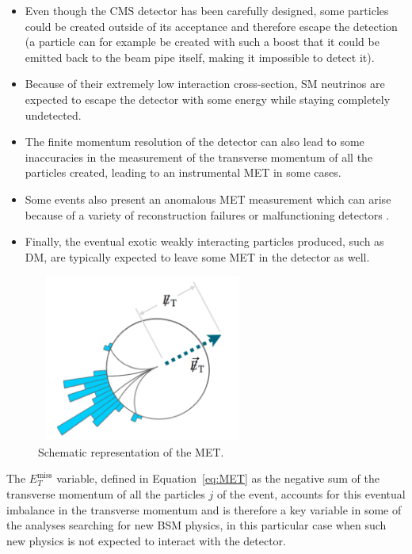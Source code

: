 \documentclass[a4paper, 10pt, openright]{report}
\begin{document}
\begin{itemize}
\item Even though the \ac{CMS} detector has been carefully designed, some particles could be created outside of its acceptance and therefore escape the detection (a particle can for example be created with such a boost that it could be emitted back to the beam pipe itself, making it impossible to detect it).
\item Because of their extremely low interaction cross-section, \ac{SM} neutrinos are expected to escape the detector with some energy while staying completely undetected.
\item The finite momentum resolution of the detector can also lead to some inaccuracies in the measurement of the transverse momentum of all the particles created, leading to an instrumental \ac{MET} in some cases.
\item Some events also present an anomalous \ac{MET} measurement which can arise because of a variety of reconstruction failures or malfunctioning detectors \cite{anomalousMET}.
\item Finally, the eventual exotic weakly interacting particles produced, such as \acf{DM}, are typically expected to leave some \ac{MET} in the detector as well.
\end{itemize}

\begin{figure}[htbp]
\begin{center}
\includegraphics[width=7cm, height=5.5cm]{figs/MET.png}
\caption{Schematic representation of the \ac{MET}.}
\label{fig:MET}
\end{center}
\end{figure}

The $E_{T}^{\text{miss}}$ variable, defined in Equation~\ref{eq:MET} as the negative sum of the transverse momentum of all the particles $j$ of the event, accounts for this eventual imbalance in the transverse momentum and is therefore a key variable in some of the analyses searching for new \ac{BSM} physics, in this particular case when such new physics is not expected to interact with the detector.
\end{document}
